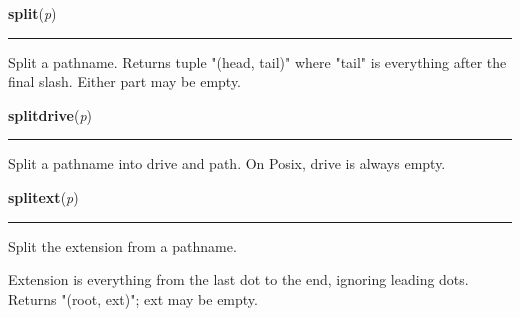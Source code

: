     \label{posixpath:split}

    \vspace{0.5ex}

\hspace{.8\funcindent}\begin{boxedminipage}{\funcwidth}

    \raggedright \textbf{split}(\textit{p})

    \vspace{-1.5ex}

    \rule{\textwidth}{0.5\fboxrule}
\setlength{\parskip}{2ex}
    Split a pathname.  Returns tuple "(head, tail)" where "tail" is 
    everything after the final slash.  Either part may be empty.

\setlength{\parskip}{1ex}
    \end{boxedminipage}

    \label{posixpath:splitdrive}

    \vspace{0.5ex}

\hspace{.8\funcindent}\begin{boxedminipage}{\funcwidth}

    \raggedright \textbf{splitdrive}(\textit{p})

    \vspace{-1.5ex}

    \rule{\textwidth}{0.5\fboxrule}
\setlength{\parskip}{2ex}
    Split a pathname into drive and path. On Posix, drive is always empty.

\setlength{\parskip}{1ex}
    \end{boxedminipage}

    \label{posixpath:splitext}

    \vspace{0.5ex}

\hspace{.8\funcindent}\begin{boxedminipage}{\funcwidth}

    \raggedright \textbf{splitext}(\textit{p})

    \vspace{-1.5ex}

    \rule{\textwidth}{0.5\fboxrule}
\setlength{\parskip}{2ex}
    Split the extension from a pathname.

    Extension is everything from the last dot to the end, ignoring leading 
    dots.  Returns "(root, ext)"; ext may be empty.

\setlength{\parskip}{1ex}
    \end{boxedminipage}

